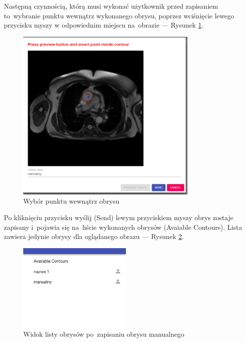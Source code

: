 \documentclass[a4paper,11pt,twoside,openright]{report}
\theoremstyle{definition}
\begin{document}
Następną czynnością, którą musi wykonać użytkownik przed zapisaniem to~wybranie
punktu wewnątrz wykonanego obrysu, poprzez wciśnięcie lewego przycisku myszy w
odpowiednim miejscu na~obrazie --- Rysunek \ref{fig:8}.


\pagebreak

\begin{figure}[h!]
	\center
	\includegraphics[width=0.8\textwidth]{8}
	\caption{Wybór punktu wewnątrz obrysu}
    	\label{fig:8}
\end{figure}

Po kliknięciu przycisku wyślij (Send) lewym przyciskiem myszy obrys zostaje
zapisany i~pojawia się na~liście wykonanych obrysów (Avaiable Contours). Lista
zawiera jedynie obrysy dla oglądanego obrazu --- Rysunek \ref{fig:9}.

\begin{figure}[h!]
	\center
	\includegraphics[width=0.5\textwidth]{9}
	\caption{Widok listy obrysów po~zapisaniu obrysu manualnego}
    	\label{fig:9}
\end{figure}
\end{document}
